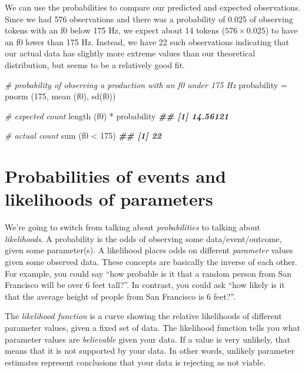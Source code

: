 \documentclass[
]{book}
\newenvironment{Shaded}{\begin{snugshade}}{\end{snugshade}}
\newcommand{\CommentTok}[1]{\textcolor[rgb]{0.56,0.35,0.01}{\textit{#1}}}
\newcommand{\DecValTok}[1]{\textcolor[rgb]{0.00,0.00,0.81}{#1}}
\newcommand{\DocumentationTok}[1]{\textcolor[rgb]{0.56,0.35,0.01}{\textbf{\textit{#1}}}}
\newcommand{\FunctionTok}[1]{\textcolor[rgb]{0.00,0.00,0.00}{#1}}
\newcommand{\NormalTok}[1]{#1}
\newcommand{\OtherTok}[1]{\textcolor[rgb]{0.56,0.35,0.01}{#1}}
\newcommand{\SpecialCharTok}[1]{\textcolor[rgb]{0.00,0.00,0.00}{#1}}
\begin{document}
We can use the probabilities to compare our predicted and expected observations. Since we had 576 observations and there was a probability of 0.025 of observing tokens with an f0 below 175 Hz, we expect about 14 tokens (\(576 \times 0.025\)) to have an f0 lower than 175 Hz. Instead, we have 22 such observations indicating that our actual data has slightly more extreme values than our theoretical distribution, but seems to be a relatively good fit.

\begin{Shaded}
\begin{Highlighting}[]
\CommentTok{\# probability of observing a production with an f0 under 175 Hz}
\NormalTok{probability }\OtherTok{=} \FunctionTok{pnorm}\NormalTok{ (}\DecValTok{175}\NormalTok{, }\FunctionTok{mean}\NormalTok{ (f0), }\FunctionTok{sd}\NormalTok{(f0)) }

\CommentTok{\# expected count}
\FunctionTok{length}\NormalTok{ (f0) }\SpecialCharTok{*}\NormalTok{ probability}
\DocumentationTok{\#\# [1] 14.56121}

\CommentTok{\# actual count}
\FunctionTok{sum}\NormalTok{ (f0 }\SpecialCharTok{\textless{}} \DecValTok{175}\NormalTok{)}
\DocumentationTok{\#\# [1] 22}
\end{Highlighting}
\end{Shaded}

\hypertarget{probabilities-of-events-and-likelihoods-of-parameters}{%
\section{Probabilities of events and likelihoods of parameters}\label{probabilities-of-events-and-likelihoods-of-parameters}}

We're going to switch from talking about \emph{probabilities} to talking about \emph{likelihoods}. A probability is the odds of observing some data/event/outcome, given some parameter(s). A likelihood places odds on different \emph{parameter} values given some observed data. These concepts are basically the inverse of each other. For example, you could say ``how probable is it that a random person from San Francisco will be over 6 feet tall?''. In contrast, you could ask ``how likely is it that the average height of people from San Francisco is 6 feet?''.

The \emph{likelihood function} is a curve showing the relative likelihoods of different parameter values, given a fixed set of data. The likelihood function tells you what parameter values are \emph{believable} given your data. If a value is very unlikely, that means that it is not supported by your data. In other words, unlikely parameter estimates represent conclusions that your data is rejecting as not viable.
\end{document}
